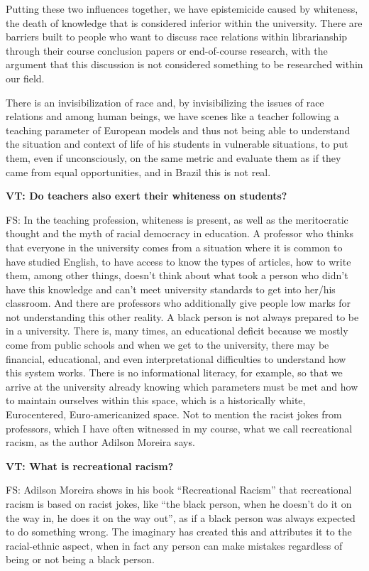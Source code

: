 \documentclass[a4paper,
fontsize=11pt,
oneside,
numbers=noperiodatend,
parskip=half-,
bibliography=totoc,
final
]{scrartcl}
\begin{document}
Putting these two influences together, we have epistemicide caused by
whiteness, the death of knowledge that is considered inferior within the
university. There are barriers built to people who want to discuss race
relations within librarianship through their course conclusion papers or
end-of-course research, with the argument that this discussion is not
considered something to be researched within our field.

There is an invisibilization of race and, by invisibilizing the issues
of race relations and among human beings, we have scenes like a teacher
following a teaching parameter of European models and thus not being
able to understand the situation and context of life of his students in
vulnerable situations, to put them, even if unconsciously, on the same
metric and evaluate them as if they came from equal opportunities, and
in Brazil this is not real.

\textbf{VT: Do teachers also exert their whiteness on students?}

FS: In the teaching profession, whiteness is present, as well as the
meritocratic thought and the myth of racial democracy in education. A
professor who thinks that everyone in the university comes from a
situation where it is common to have studied English, to have access to
know the types of articles, how to write them, among other things,
doesn't think about what took a person who didn't have this knowledge
and can't meet university standards to get into her/his classroom. And
there are professors who additionally give people low marks for not
understanding this other reality. A black person is not always prepared
to be in a university. There is, many times, an educational deficit
because we mostly come from public schools and when we get to the
university, there may be financial, educational, and even
interpretational difficulties to understand how this system works. There
is no informational literacy, for example, so that we arrive at the
university already knowing which parameters must be met and how to
maintain ourselves within this space, which is a historically white,
Eurocentered, Euro-americanized space. Not to mention the racist jokes
from professors, which I have often witnessed in my course, what we call
recreational racism, as the author Adilson Moreira says.

\textbf{VT: What is recreational racism?}

FS: Adilson Moreira shows in his book \enquote{Recreational Racism} that
recreational racism is based on racist jokes, like \enquote{the black person,
when he doesn't do it on the way in, he does it on the way out}, as if a
black person was always expected to do something wrong. The imaginary
has created this and attributes it to the racial-ethnic aspect, when in
fact any person can make mistakes regardless of being or not being a
black person.
\end{document}
